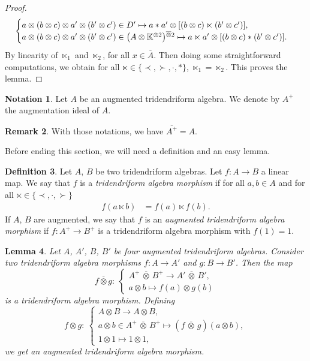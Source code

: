 \documentclass[pdftex]{sigma}
\numberwithin{equation}{section}
\theoremstyle{definition}
\newtheorem{defi}{Definition}[section]
\newtheorem{Rq}[defi]{Remark}
\newtheorem{Not}[defi]{Notation}
\theoremstyle{plain}
\newtheorem{Lemme}[defi]{Lemma}
\newcommand{\K}{\mathbb{K}}
\begin{document}
\begin{proof}
\begin{equation*}
\begin{cases}
	a\otimes (b\otimes c) \otimes a'\otimes(b'\otimes c')\in D' \mapsto 	a*a'\otimes [(b\otimes c)\ltimes (b'\otimes c')], \\
	a\otimes (b\otimes c) \otimes a'\otimes(b'\otimes c')\in\smash{\big(A\otimes\K^{\otimes 2 }\big)}^{\overline{\otimes} 2} \mapsto 	a\ltimes a'\otimes [(b\otimes c)* (b'\otimes c')].
	\end{cases}
\end{equation*}
By linearity of $\ltimes_1$ and $\ltimes_2$, for all $x\in \overline{A}$.
Then doing some straightforward computations, we obtain for all $\ltimes\in\{\prec,\succ,\cdot,*\}$, $\ltimes_1=\ltimes_2$. This proves the lemma.
\end{proof}

\begin{Not}
	Let $A$ be an augmented tridendriform algebra. We denote by $A^+$ the augmentation ideal of $A$.
\end{Not}
 \begin{Rq}
 	With those notations, we have $\overline{A^+}=A$.
 \end{Rq}
 Before ending this section, we will need a definition and an easy lemma.
 \begin{defi}
 	Let $A$, $B$ be two tridendriform algebras. Let $f\colon A\rightarrow B$ a linear map.
 	We say that $f$ is a \emph{tridendriform algebra morphism} if for all $a,b\in A$ and for all $\ltimes\in\{\prec,\cdot,\succ\}$
 	\begin{align*}
 		f(a\ltimes b)&=f(a)\ltimes f(b).
 	\end{align*}
 	If $A$, $B$ are augmented, we say that $f$ is an \emph{augmented tridendriform algebra morphism} if $f\colon A^+\rightarrow B^+$ is a tridendriform algebra morphism with $f(1)=1.$
 \end{defi}
 \begin{Lemme}\label{Lemme:morphtridend}
 	Let $A$, $A'$, $B$, $B'$ be four augmented tridendriform algebras. Consider two tridendriform algebra morphisms $f\colon A\rightarrow A'$ and $g\colon B\rightarrow B'$. Then the map
 	\begin{equation*}
 		f\overline{\otimes} g \colon \ \begin{cases}
 			A^+\,\overline{\otimes}\, B^+ \rightarrow A'\,\overline{\otimes}\, B', \\
 			a\otimes b \mapsto f(a)\otimes g(b)
 		\end{cases}
 	\end{equation*}
 	is a tridendriform algebra morphism. Defining
 	\begin{equation*}
 		f\otimes g \colon \ \begin{cases}
 			A\otimes B \rightarrow A\otimes B, \\
 			a\otimes b\in A^+\,\overline{\otimes}\, B^+ \mapsto (f\,\overline{\otimes}\, g)(a\otimes b), \\
 			1\otimes 1 \mapsto 1\otimes 1,
 		\end{cases}
 	\end{equation*}
 	we get an augmented tridendriform algebra morphism.
 \end{Lemme}
\end{document}
